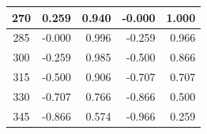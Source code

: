 \begin{table}[htbp]
\begin{center}
\begin{tabular}{|p{20mm}|p{20mm}|p{20mm}|p{20mm}|p{20mm}|}
            \multicolumn{1}{|c|}{270}                  & \multicolumn{1}{|r|}{0.259}                      & \multicolumn{1}{|r|}{0.940}        & \multicolumn{1}{|r|}{-0.000}      & \multicolumn{1}{|r|}{1.000}      \\ \hline
            \multicolumn{1}{|c|}{285}                  & \multicolumn{1}{|r|}{-0.000}                     & \multicolumn{1}{|r|}{0.996}        & \multicolumn{1}{|r|}{-0.259}      & \multicolumn{1}{|r|}{0.966}      \\ \hline
            \multicolumn{1}{|c|}{300}                  & \multicolumn{1}{|r|}{-0.259}                     & \multicolumn{1}{|r|}{0.985}        & \multicolumn{1}{|r|}{-0.500}      & \multicolumn{1}{|r|}{0.866}      \\ \hline
            \multicolumn{1}{|c|}{315}                  & \multicolumn{1}{|r|}{-0.500}                     & \multicolumn{1}{|r|}{0.906}        & \multicolumn{1}{|r|}{-0.707}      & \multicolumn{1}{|r|}{0.707}      \\ \hline
            \multicolumn{1}{|c|}{330}                  & \multicolumn{1}{|r|}{-0.707}                     & \multicolumn{1}{|r|}{0.766}        & \multicolumn{1}{|r|}{-0.866}      & \multicolumn{1}{|r|}{0.500}      \\ \hline
            \multicolumn{1}{|c|}{345}                  & \multicolumn{1}{|r|}{-0.866}                     & \multicolumn{1}{|r|}{0.574}        & \multicolumn{1}{|r|}{-0.966}      & \multicolumn{1}{|r|}{0.259}      \\ \hline
        \end{tabular}
    \end{center}
\end{table}

